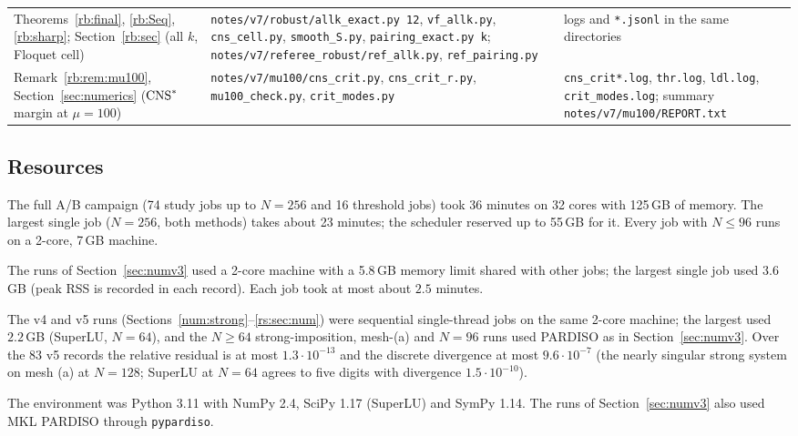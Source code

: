 {\begin{longtable}{>{\raggedright\arraybackslash}p{}>{\raggedright\arraybackslash}p{}>{\raggedright\arraybackslash}p{}}
Theorems~\ref{rb:final}, \ref{rb:Seq}, \ref{rb:sharp}; Section~\ref{rb:sec} (all $k$, Floquet cell) & \texttt{notes/v7/robust/}\allowbreak\texttt{allk\_exact.py 12}, \texttt{vf\_allk.py}, \texttt{cns\_cell.py}, \texttt{smooth\_S.py}, \texttt{pairing\_exact.py k}; \texttt{notes/v7/}\allowbreak\texttt{referee\_robust/}\allowbreak\texttt{ref\_allk.py}, \texttt{ref\_pairing.py} & logs and \texttt{*.jsonl} in the same directories\\
Remark~\ref{rb:rem:mu100}, Section~\ref{sec:numerics} ($\mathrm{CNS}^\ast$ margin at $\mu=100$) & \texttt{notes/v7/mu100/cns\_crit.py}, \texttt{cns\_crit\_r.py}, \texttt{mu100\_check.py}, \texttt{crit\_modes.py} & \texttt{cns\_crit*.log}, \texttt{thr.log}, \texttt{ldl.log}, \texttt{crit\_modes.log}; summary \texttt{notes/v7/mu100/REPORT.txt}\\
\bottomrule
\end{longtable}
}

\subsection*{Resources}
The full A/B campaign (74 study jobs up to $N=256$ and 16 threshold jobs) took 36 minutes on 32 cores with 125\,GB of memory. The largest single job ($N=256$, both methods) takes about 23 minutes; the scheduler reserved up to 55\,GB for it. Every job with $N\le96$ runs on a 2-core, 7\,GB machine.

The runs of Section~\ref{sec:numv3} used a 2-core machine with a 5.8\,GB memory limit shared with other jobs; the largest single job used 3.6\,GB (peak RSS is recorded in each record). Each job took at most about $2.5$ minutes.

The v4 and v5 runs (Sections~\ref{num:strong}--\ref{rs:sec:num}) were sequential single-thread jobs on the same 2-core machine; the largest used $2.2$\,GB (SuperLU, $N=64$), and the $N\ge64$ strong-imposition, mesh-(a) and $N=96$ runs used PARDISO as in Section~\ref{sec:numv3}. Over the $83$ v5 records the relative residual is at most $1.3\cdot10^{-13}$ and the discrete divergence at most $9.6\cdot10^{-7}$ (the nearly singular strong system on mesh (a) at $N=128$; SuperLU at $N=64$ agrees to five digits with divergence $1.5\cdot10^{-10}$).

The environment was Python 3.11 with NumPy 2.4, SciPy 1.17 (SuperLU) and SymPy 1.14. The runs of Section~\ref{sec:numv3} also used MKL PARDISO through \texttt{pypardiso}.
